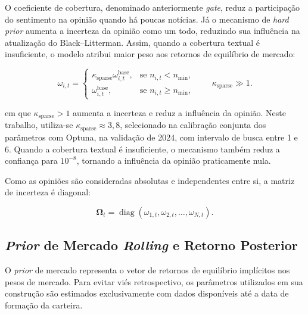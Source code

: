 O coeficiente de cobertura, denominado anteriormente
\textit{gate}, reduz a participação do sentimento na opinião
quando há poucas notícias. Já o mecanismo de \textit{hard prior}
aumenta a incerteza da opinião como um todo, reduzindo sua
influência na atualização do Black--Litterman. Assim, quando
a cobertura textual é insuficiente, o modelo atribui maior
peso aos retornos de equilíbrio de mercado:

\begin{equation}
    \omega_{i,t}
    =
    \begin{cases}
        \kappa_{\mathrm{sparse}}
        \omega_{i,t}^{\mathrm{base}},
        & \text{se } n_{i,t}<n_{\min},\\
        \omega_{i,t}^{\mathrm{base}},
        & \text{se } n_{i,t}\geq n_{\min},
    \end{cases}
    \qquad
    \kappa_{\mathrm{sparse}}\gg1.
    \label{eq:omega_hard_prior}
\end{equation}

\noindent
em que $\kappa_{\mathrm{sparse}}>1$ aumenta a incerteza e reduz
a influência da opinião. Neste trabalho, utiliza-se
$\kappa_{\mathrm{sparse}}\approx 3{,}8$, selecionado na calibração
conjunta dos parâmetros com Optuna, na validação de 2024,
com intervalo de busca entre 1 e 6. Quando a cobertura textual
é insuficiente, o mecanismo também reduz a confiança para
$10^{-8}$, tornando a influência da opinião praticamente nula.

Como as opiniões são consideradas absolutas e independentes entre si, a matriz de incerteza é diagonal:

\begin{equation}
    \boldsymbol{\Omega}_t
    =
    \operatorname{diag}
    \left(
        \omega_{1,t},
        \omega_{2,t},
        \ldots,
        \omega_{N,t}
    \right).
    \label{eq:matriz_omega}
\end{equation}

\subsection{\textit{Prior} de Mercado \textit{Rolling} e Retorno Posterior}
\label{subsec:prior_rolling}

O \textit{prior} de mercado representa o vetor de retornos de equilíbrio implícitos nos pesos de mercado. Para evitar viés retrospectivo, os parâmetros utilizados em sua construção são estimados exclusivamente com dados disponíveis até a data de formação da carteira.


